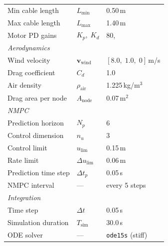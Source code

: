 \begin{table}[htbp]
\begin{tabular}{l l l}
Min cable length           & $L_{\min}$       & 0.50\,m \\
Max cable length           & $L_{\max}$       & 1.40\,m \\
Motor PD gains             & $K_p,\;K_d$      & 80,\;12 \\
\hline
\multicolumn{3}{l}{\textit{Aerodynamics}} \\
Wind velocity              & $\mathbf{v}_{\mathrm{wind}}$ & $[8.0,\;1.0,\;0]$\,m/s \\
Drag coefficient           & $C_d$            & 1.0 \\
Air density                & $\rho_{\mathrm{air}}$ & 1.225\,kg/m$^3$ \\
Drag area per node         & $A_{\mathrm{node}}$  & 0.07\,m$^2$ \\
\hline
\multicolumn{3}{l}{\textit{NMPC}} \\
Prediction horizon         & $N_p$            & 6 \\
Control dimension          & $n_u$            & 3 \\
Control limit              & $u_{\mathrm{lim}}$  & 0.15\,m \\
Rate limit                 & $\Delta u_{\mathrm{lim}}$ & 0.06\,m \\
Prediction time step       & $\Delta t_p$     & 0.05\,s \\
NMPC interval              & ---              & every 5 steps \\
\hline
\multicolumn{3}{l}{\textit{Integration}} \\
Time step                  & $\Delta t$       & 0.05\,s \\
Simulation duration        & $T_{\mathrm{sim}}$ & 30.0\,s \\
ODE solver                 & ---              & \texttt{ode15s} (stiff) \\
\hline
\end{tabular}
\end{table}



